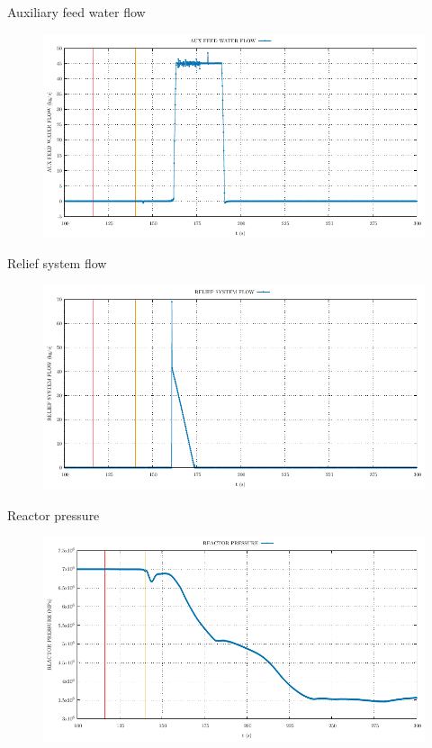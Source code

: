 \begin{frame}{Auxiliary feed water flow}
	\begin{figure}
		\centering
		\includegraphics[width=\textwidth]{./graphs/AUX FEED WATER FLOW_comp.pdf}
		
	\end{figure}
	
\end{frame}
\begin{frame}{Relief system flow}
	\begin{figure}
		\centering
		\includegraphics[width=\textwidth]{./graphs/RELIEF SYSTEM FLOW_comp.pdf}
		
	\end{figure}
	
\end{frame}
\begin{frame}{Reactor pressure}
	\begin{figure}
		\centering
		\includegraphics[width=\textwidth]{./graphs/REACTOR PRESSURE_comp.pdf}
		
	\end{figure}
	
\end{frame}

